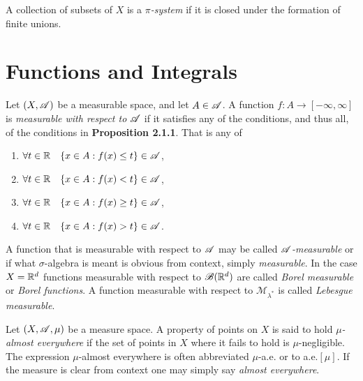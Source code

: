 \documentclass[12pt]{article}
\begin{document}
\begin{definition}[$\pi$-system]
    A collection of subsets of $X$ is a \textit{$\pi$-system} if it is closed under the formation of finite unions.
\end{definition}
\newpage
\section{Functions and Integrals}
\begin{definition}
    Let $(X,\mathscr{A})$ be a measurable space, and let $A\in \mathscr{A}$. A function $f:A\to[-\infty,\infty]$ is \textit{measurable with respect to $\mathscr{A}$} if it satisfies any of the conditions, and thus all, of the conditions in \textbf{Proposition 2.1.1}. That is any of
    \begin{enumerate}[label=(\alph*)]
        \item $\forall t\in \mathbb{R} \quad \{x\in A: f(x)\leq t\}\in\mathscr{A}$,
        \item $\forall t\in \mathbb{R} \quad \{x\in A: f(x)< t\}\in\mathscr{A}$,
        \item $\forall t\in \mathbb{R} \quad \{x\in A: f(x)\geq t\}\in\mathscr{A}$,
        \item $\forall t\in \mathbb{R} \quad \{x\in A: f(x)> t\}\in\mathscr{A}$.
    \end{enumerate}
    A function that is measurable with respect to $\mathscr{A}$ may be called \textit{$\mathscr{A}$-measurable} or if what $\sigma$-algebra is meant is obvious from context, simply \textit{measurable}. In the case $X=\mathbb{R}^d$ functions measurable with respect to $\mathscr{B}(\mathbb{R}^d)$ are called \textit{Borel measurable} or \textit{Borel functions}. A function measurable with respect to $\mathscr{M}_{\lambda^*}$ is called \textit{Lebesgue measurable}.
\end{definition}
\begin{definition}
    Let $(X,\mathscr{A},\mu)$ be a measure space. A property of points on $X$ is said to hold \textit{$\mu$-almost everywhere} if the set of points in $X$ where it fails to hold is $\mu$-negligible. The expression $\mu$-almost everywhere is often abbreviated $\mu$-a.e. or to a.e.$[\mu]$. If the measure is clear from context one may simply say \textit{almost everywhere}.
\end{definition}
\end{document}
